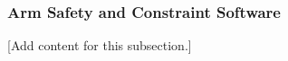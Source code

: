 
\subsubsection{Arm Safety and Constraint Software}
\label{subsubsec:design_2_5_7_arm_safety_constraint_software}

[Add content for this subsection.]
